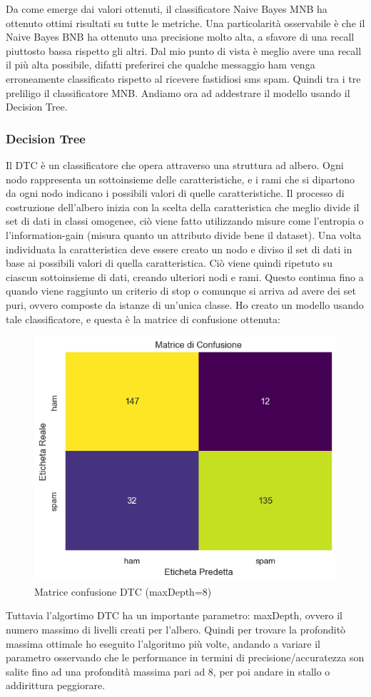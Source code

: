 \documentclass[]{article}
\begin{document}
                    Da come emerge dai valori ottenuti, il classificatore Naive Bayes MNB ha ottenuto ottimi risultati su tutte le metriche. Una particolarità osservabile è che il Naive Bayes BNB ha ottenuto una precisione molto alta, a sfavore di una recall piuttosto bassa rispetto gli altri. Dal mio punto di vista è meglio avere una recall il più alta possibile, difatti preferirei che qualche messaggio ham venga erroneamente classificato rispetto al ricevere fastidiosi sms spam. Quindi tra i tre preliligo il classificatore MNB.
                    Andiamo ora ad addestrare il modello usando il Decision Tree.

                \subsubsection{Decision Tree}
                    Il DTC è un classificatore che opera attraverso una struttura ad albero. Ogni nodo rappresenta un sottoinsieme delle caratteristiche, e i rami che si dipartono da ogni nodo indicano i possibili valori di quelle caratteristiche.
                    Il processo di costruzione dell'albero inizia con la scelta della caratteristica che meglio divide il set di dati in classi omogenee, ciò viene fatto utilizzando misure come l'entropia o l'information-gain (misura quanto un attributo divide bene il dataset). Una volta individuata la caratteristica deve essere creato un nodo e  diviso il set di dati in base ai possibili valori di quella caratteristica. Ciò viene quindi ripetuto su ciascun sottoinsieme di dati, creando ulteriori nodi e rami. Questo continua fino a quando viene raggiunto un criterio di stop o comunque si arriva ad avere dei set puri, ovvero composte da istanze di un'unica classe.
                    Ho creato un modello usando tale classificatore, e questa è la matrice di confusione ottenuta:
                    \begin{figure}[H]
                        \centering
                        \includegraphics[width=0.5\linewidth]{images/dtcResult.png}
                        \caption{Matrice confusione DTC (maxDepth=8)}
                        \label{fig:enter-label}
                    \end{figure}
                    Tuttavia l'algortimo DTC ha un importante parametro: maxDepth, ovvero il numero massimo di livelli creati per l'albero. Quindi per trovare la profonditò massima ottimale ho eseguito l'algoritmo più volte, andando a variare il parametro osservando che le performance in termini di precisione/accuratezza son salite fino ad una profondità massima pari ad 8, per poi andare in stallo o addirittura peggiorare.
\end{document}

